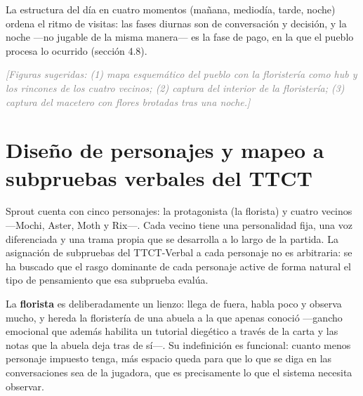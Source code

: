 \documentclass[12pt,twoside,titlepage]{report}
\begin{document}
La estructura del día en cuatro momentos (mañana, mediodía, tarde, noche) ordena el ritmo de visitas: las fases diurnas son de conversación y decisión, y la noche ---no jugable de la misma manera--- es la fase de pago, en la que el pueblo procesa lo ocurrido (sección 4.8).

\textcolor{gray}{\textit{[Figuras sugeridas: (1) mapa esquemático del pueblo con la floristería como hub y los rincones de los cuatro vecinos; (2) captura del interior de la floristería; (3) captura del macetero con flores brotadas tras una noche.]}}

\section{Diseño de personajes y mapeo a subpruebas verbales del TTCT}

Sprout cuenta con cinco personajes: la protagonista (la florista) y cuatro vecinos ---Mochi, Aster, Moth y Rix---. Cada vecino tiene una personalidad fija, una voz diferenciada y una trama propia que se desarrolla a lo largo de la partida. La asignación de subpruebas del TTCT-Verbal a cada personaje no es arbitraria: se ha buscado que el rasgo dominante de cada personaje active de forma natural el tipo de pensamiento que esa subprueba evalúa.

La \textbf{florista} es deliberadamente un lienzo: llega de fuera, habla poco y observa mucho, y hereda la floristería de una abuela a la que apenas conoció ---gancho emocional que además habilita un tutorial diegético a través de la carta y las notas que la abuela deja tras de sí---. Su indefinición es funcional: cuanto menos personaje impuesto tenga, más espacio queda para que lo que se diga en las conversaciones sea de la jugadora, que es precisamente lo que el sistema necesita observar.
\end{document}
